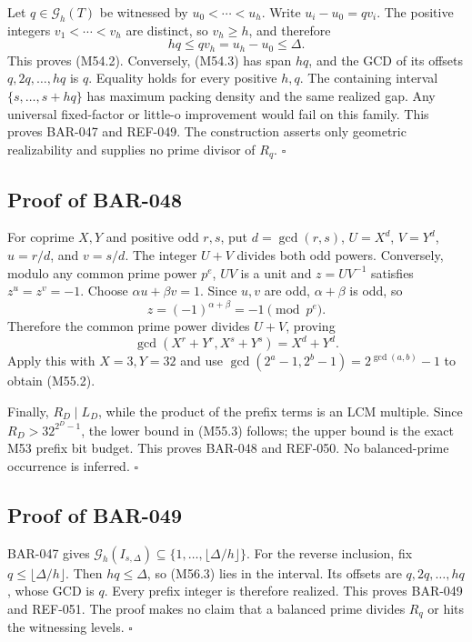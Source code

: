 \documentclass[11pt]{article}
\begin{document}
Let \(q\in\mathcal G_h(T)\) be witnessed by
\(u_0<\cdots<u_h\). Write \(u_i-u_0=qv_i\). The positive integers
\(v_1<\cdots<v_h\) are distinct, so \(v_h\ge h\), and therefore
\[
hq\le qv_h=u_h-u_0\le\Delta.
\]
This proves (M54.2). Conversely, (M54.3) has span \(hq\), and the GCD of
its offsets \(q,2q,\ldots,hq\) is \(q\). Equality holds for every positive
\(h,q\). The containing interval \(\{s,\ldots,s+hq\}\) has maximum packing
density and the same realized gap. Any universal fixed-factor or little-o
improvement would fail on this family. This proves BAR-047 and REF-049. The construction asserts only
geometric realizability and supplies no prime divisor of \(R_q\). \(\square\)

\subsection{Proof of BAR-048}
\label{proof:BAR-048}

For coprime \(X,Y\) and positive odd \(r,s\), put
\(d=\gcd(r,s)\), \(U=X^d\), \(V=Y^d\),
\(u=r/d\), and \(v=s/d\). The integer \(U+V\) divides both odd powers.
Conversely, modulo any common prime power \(p^e\), \(UV\) is a unit and
\(z=UV^{-1}\) satisfies \(z^u=z^v=-1\). Choose
\(\alpha u+\beta v=1\). Since \(u,v\) are odd, \(\alpha+\beta\) is odd, so
\[
z=(-1)^{\alpha+\beta}=-1\pmod{p^e}.
\]
Therefore the common prime power divides \(U+V\), proving
\[
\gcd(X^r+Y^r,X^s+Y^s)=X^d+Y^d.
\]
Apply this with \(X=3,Y=32\) and use
\(\gcd(2^a-1,2^b-1)=2^{\gcd(a,b)}-1\) to obtain (M55.2).

Finally, \(R_D\mid L_D\), while the product of the prefix terms is an LCM
multiple. Since \(R_D>32^{2^D-1}\), the lower bound in (M55.3) follows;
the upper bound is the exact M53 prefix bit budget. This proves BAR-048 and
REF-050. No balanced-prime occurrence is inferred. \(\square\)

\subsection{Proof of BAR-049}
\label{proof:BAR-049}

BAR-047 gives
\(\mathcal G_h(I_{s,\Delta})
\subseteq\{1,\ldots,\lfloor\Delta/h\rfloor\}\).
For the reverse inclusion, fix \(q\le\lfloor\Delta/h\rfloor\). Then
\(hq\le\Delta\), so (M56.3) lies in the interval. Its offsets are
\(q,2q,\ldots,hq\), whose GCD is \(q\). Every prefix integer is therefore
realized. This proves BAR-049 and REF-051. The proof makes no claim that a
balanced prime divides \(R_q\) or hits the witnessing levels. \(\square\)
\end{document}
